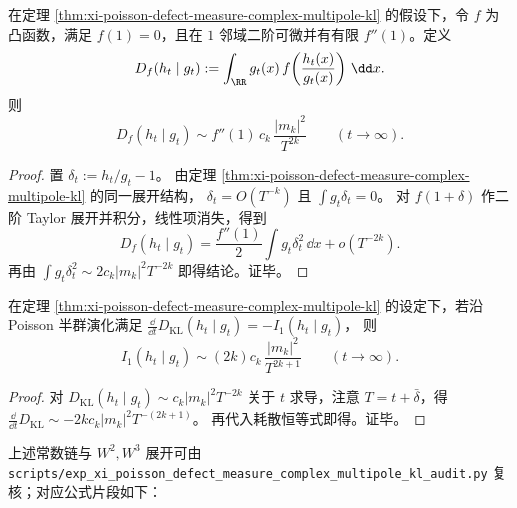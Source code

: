 \begin{proposition}\label{prop:xi-poisson-defect-measure-fdiv-multipole}
在定理 \ref{thm:xi-poisson-defect-measure-complex-multipole-kl} 的假设下，令 \(f\) 为凸函数，满足 \(f(1)=0\)，且在 \(1\) 邻域二阶可微并有有限 \(f''(1)\)。定义
\[
D_f(h_t\mid g_t):=\int_{\RR}g_t(x)\,
f\!\left(\frac{h_t(x)}{g_t(x)}\right)\,\dd x.
\]
则
\[
D_f(h_t\mid g_t)\sim f''(1)\,c_k\,\frac{|m_k|^2}{T^{2k}}
\qquad(t\to\infty).
\]
\end{proposition}
\begin{proof}
置 \(\delta_t:=h_t/g_t-1\)。
由定理 \ref{thm:xi-poisson-defect-measure-complex-multipole-kl} 的同一展开结构，
\(
\delta_t=O(T^{-k})
\)
且
\(
\int g_t\delta_t=0
\)。
对 \(f(1+\delta)\) 作二阶 Taylor 展开并积分，线性项消失，得到
\[
D_f(h_t\mid g_t)=\frac{f''(1)}{2}\int g_t\delta_t^2\,\dd x+o(T^{-2k}).
\]
再由
\(
\int g_t\delta_t^2\sim 2c_k|m_k|^2T^{-2k}
\)
即得结论。证毕。
\end{proof}

\begin{corollary}[信息耗散量的全阶主常数]\label{cor:xi-poisson-defect-measure-i1-multipole}
在定理 \ref{thm:xi-poisson-defect-measure-complex-multipole-kl} 的设定下，若沿 Poisson 半群演化满足
\(
\frac{\dd}{\dd t}D_{\mathrm{KL}}(h_t\mid g_t)=-I_1(h_t\mid g_t)
\)，
则
\[
I_1(h_t\mid g_t)\sim (2k)c_k\,\frac{|m_k|^2}{T^{2k+1}}
\qquad(t\to\infty).
\]
\end{corollary}
\begin{proof}
对
\(
D_{\mathrm{KL}}(h_t\mid g_t)\sim c_k|m_k|^2T^{-2k}
\)
关于 \(t\) 求导，注意 \(T=t+\bar\delta\)，得
\(
\frac{\dd}{\dd t}D_{\mathrm{KL}}\sim -2kc_k|m_k|^2T^{-(2k+1)}
\)。
再代入耗散恒等式即得。证毕。
\end{proof}

\begin{remark}[复多极常数链与核验片段]\label{rem:xi-poisson-defect-measure-complex-multipole-audit-snippet}
上述常数链与 \(W^2,W^3\) 展开可由
\texttt{scripts/exp\_xi\_poisson\_defect\_measure\_complex\_multipole\_kl\_audit.py}
复核；对应公式片段如下：

\end{remark}

\endinput

